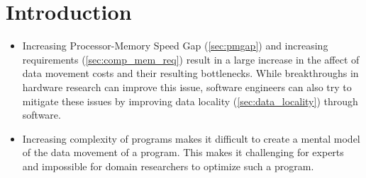 \section{Introduction}\label{sec:introduction}
\begin{itemize}
\item Increasing Processor-Memory Speed Gap (\ref{sec:pmgap}) and increasing requirements (\ref{sec:comp_mem_req}) result in a large increase in the affect of data movement costs and their resulting bottlenecks. While breakthroughs in hardware research can improve this issue, software engineers can also try to mitigate these issues by improving data locality (\ref{sec:data_locality}) through software.
\item Increasing complexity of programs makes it difficult to create a mental model of the data movement of a program. This makes it challenging for experts and impossible for domain researchers to optimize such a program.
\end{itemize}
